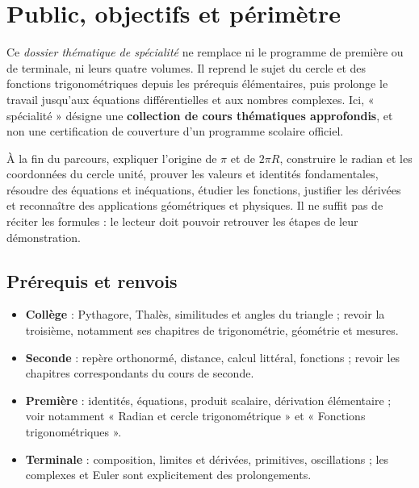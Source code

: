\documentclass[11pt,a4paper,oneside]{book}
\begin{document}
\frontmatter\tableofcontents\mainmatter
\chapter{Public, objectifs et périmètre}
Ce \emph{dossier thématique de spécialité} ne remplace ni le programme de première ou de terminale, ni leurs quatre volumes. Il reprend le sujet du cercle et des fonctions trigonométriques depuis les prérequis élémentaires, puis prolonge le travail jusqu'aux équations différentielles et aux nombres complexes. Ici, « spécialité » désigne une \textbf{collection de cours thématiques approfondis}, et non une certification de couverture d'un programme scolaire officiel.
\begin{objectif}
À la fin du parcours, expliquer l'origine de $\pi$ et de $2\pi R$, construire le radian et les coordonnées du cercle unité, prouver les valeurs et identités fondamentales, résoudre des équations et inéquations, étudier les fonctions, justifier les dérivées et reconnaître des applications géométriques et physiques. Il ne suffit pas de réciter les formules : le lecteur doit pouvoir retrouver les étapes de leur démonstration.
\end{objectif}
\section{Prérequis et renvois}
\begin{itemize}
\item \textbf{Collège} : Pythagore, Thalès, similitudes et angles du triangle ; revoir la troisième, notamment ses chapitres de trigonométrie, géométrie et mesures.
\item \textbf{Seconde} : repère orthonormé, distance, calcul littéral, fonctions ; revoir les chapitres correspondants du cours de seconde.
\item \textbf{Première} : identités, équations, produit scalaire, dérivation élémentaire ; voir notamment « Radian et cercle trigonométrique » et « Fonctions trigonométriques ».
\item \textbf{Terminale} : composition, limites et dérivées, primitives, oscillations ; les complexes et Euler sont explicitement des prolongements.
\end{itemize}
\end{document}
